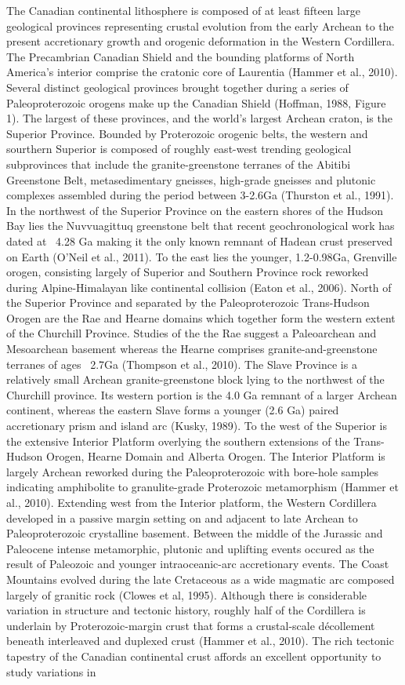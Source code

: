 \documentclass[review]{elsarticle}
\begin{document}
The Canadian continental lithosphere is composed of at least fifteen large geological provinces representing crustal evolution from the early Archean to the present accretionary growth and orogenic deformation in the Western Cordillera. The Precambrian Canadian Shield and the bounding platforms of North America's interior comprise the cratonic core of Laurentia (Hammer et al., 2010). Several distinct geological provinces brought together during a series of Paleoproterozoic orogens make up the Canadian Shield (Hoffman, 1988, Figure 1). The largest of these provinces, and the world's largest Archean craton, is the Superior Province. Bounded by Proterozoic orogenic belts, the western and sourthern Superior is composed of roughly east-west trending geological subprovinces that include the granite-greenstone terranes of the Abitibi Greenstone Belt, metasedimentary gneisses, high-grade gneisses and plutonic complexes assembled during the period between 3-2.6Ga (Thurston et al., 1991). In the northwest of the Superior Province on the eastern shores of the Hudson Bay lies the Nuvvuagittuq greenstone belt that recent geochronological work has dated at ~4.28 Ga making it the only known remnant of Hadean crust preserved on Earth (O'Neil et al., 2011). To the east lies the younger, 1.2-0.98Ga, Grenville orogen, consisting largely of Superior and Southern Province rock reworked during Alpine-Himalayan like continental collision (Eaton et al., 2006). North of the Superior Province and separated by the Paleoproterozoic Trans-Hudson Orogen are the Rae and Hearne domains which together form the western extent of the Churchill Province. Studies of the the Rae suggest a Paleoarchean and Mesoarchean basement whereas the Hearne comprises granite-and-greenstone terranes of ages ~2.7Ga (Thompson et al., 2010). The Slave Province is a relatively small Archean granite-greenstone block lying to the northwest of the Churchill province. Its western portion is the 4.0 Ga remnant of a larger Archean continent, whereas the eastern Slave forms a younger (2.6 Ga) paired accretionary prism and island arc (Kusky, 1989). To the west of the Superior is the extensive Interior Platform overlying the southern extensions of the Trans-Hudson Orogen, Hearne Domain and Alberta Orogen. The Interior Platform is largely Archean reworked during the Paleoproterozoic with bore-hole samples indicating amphibolite to granulite-grade Proterozoic metamorphism (Hammer et al., 2010). Extending west from the Interior platform, the Western Cordillera developed in a passive margin setting on and adjacent to late Archean to Paleoproterozoic crystalline basement. Between the middle of the Jurassic and Paleocene intense metamorphic, plutonic and uplifting events occured as the result of Paleozoic and younger intraoceanic-arc accretionary events. The Coast Mountains evolved during the late Cretaceous as a wide magmatic arc composed largely of granitic rock (Clowes et al, 1995). Although there is considerable variation in structure and tectonic history, roughly half of the Cordillera is underlain by Proterozoic-margin crust that forms a crustal-scale décollement beneath interleaved and duplexed crust (Hammer et al., 2010). The rich tectonic tapestry of the Canadian continental crust affords an excellent opportunity to study variations in 
\end{document}
